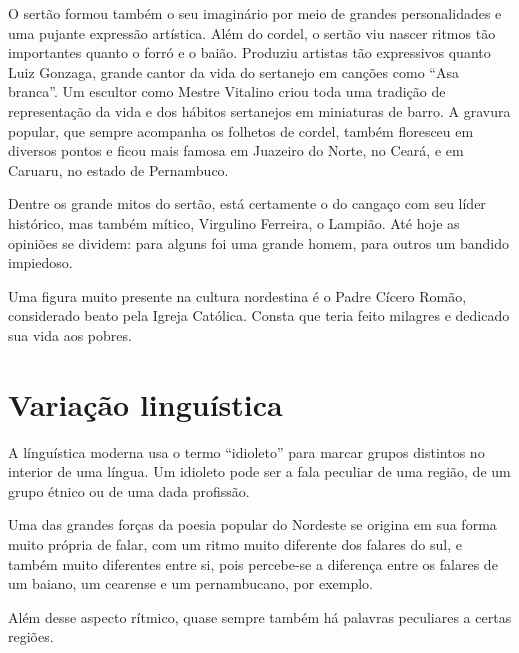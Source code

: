 O sertão formou também o seu imaginário por meio de grandes personalidades e
uma pujante expressão artística. Além do cordel, o sertão viu nascer ritmos tão
importantes quanto o forró e o baião. Produziu artistas tão expressivos quanto
Luiz Gonzaga, grande cantor da vida do sertanejo em canções como “Asa branca”.
Um escultor como Mestre Vitalino criou toda uma tradição de representação da
vida e dos hábitos sertanejos em miniaturas de barro. A gravura popular, que
sempre acompanha os folhetos de cordel, também floresceu em diversos pontos e
ficou mais famosa em Juazeiro do Norte, no Ceará, e em Caruaru, no estado de
Pernambuco. 

Dentre os grande mitos do sertão, está certamente o do cangaço com seu líder
histórico, mas também mítico, Virgulino Ferreira, o Lampião. Até hoje as
opiniões se dividem: para alguns foi uma grande homem, para outros um bandido
impiedoso. 

Uma figura muito presente na cultura nordestina é o Padre Cícero Romão,
considerado beato pela Igreja Católica. Consta que teria feito milagres e
dedicado sua vida aos pobres. 

\section{Variação linguística}

A línguística moderna usa o termo “idioleto” para marcar grupos distintos no
interior de uma língua. Um idioleto pode ser a fala peculiar de uma região, de
um grupo étnico ou de uma dada profissão. 

Uma das grandes forças da poesia popular do Nordeste se origina em sua forma
muito própria de falar, com um ritmo muito diferente dos falares do sul, e
também muito diferentes entre si, pois percebe-se a diferença entre os falares
de um baiano, um cearense e um pernambucano, por exemplo.

Além desse aspecto rítmico, quase sempre também há palavras peculiares a certas
regiões. 

